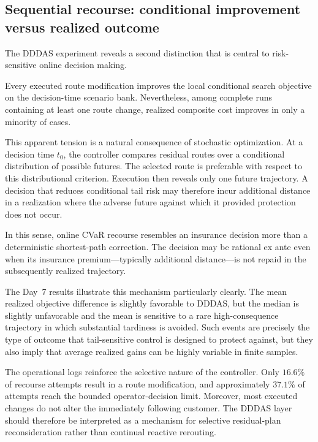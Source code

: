 \documentclass[preprint,12pt]{elsarticle}
\newcommand{\1}{\mathbf{1}}
\begin{document}
\subsection{Sequential recourse: conditional improvement versus realized outcome}
\label{subsec:discussion_dddas}

The DDDAS experiment reveals a second distinction that is central to
risk-sensitive online decision making.

Every executed route modification improves the local conditional search
objective on the decision-time scenario bank. Nevertheless, among complete runs
containing at least one route change, realized composite cost improves in only a
minority of cases.

This apparent tension is a natural consequence of stochastic optimization.
At a decision time $t_0$, the controller compares residual routes over a
conditional distribution of possible futures. The selected route is preferable
with respect to this distributional criterion. Execution then reveals only one
future trajectory. A decision that reduces conditional tail risk may therefore
incur additional distance in a realization where the adverse future against
which it provided protection does not occur.

In this sense, online CVaR recourse resembles an insurance decision more than a
deterministic shortest-path correction. The decision may be rational ex ante
even when its insurance premium---typically additional distance---is not repaid
in the subsequently realized trajectory.

The Day~7 results illustrate this mechanism particularly clearly. The mean
realized objective difference is slightly favorable to DDDAS, but the median is
slightly unfavorable and the mean is sensitive to a rare high-consequence
trajectory in which substantial tardiness is avoided. Such events are precisely
the type of outcome that tail-sensitive control is designed to protect against,
but they also imply that average realized gains can be highly variable in
finite samples.

The operational logs reinforce the selective nature of the controller.
Only $16.6\%$ of recourse attempts result in a route modification, and
approximately $37.1\%$ of attempts reach the bounded operator-decision limit.
Moreover, most executed changes do not alter the immediately following
customer. The DDDAS layer should therefore be interpreted as a mechanism for
selective residual-plan reconsideration rather than continual reactive
rerouting.
\end{document}
